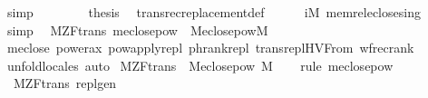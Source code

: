 \begin{isabellebody}
\ simp\isanewline
\ \ \isacommand{{\isacharbraceright}{\kern0pt}}\isamarkupfalse%
\isanewline
\ \ \isamarkupfalse%
\ \isamarkupfalse%
\ {\isacharquery}{\kern0pt}thesis\ \isamarkupfalse%
\ transrec{\isacharunderscore}{\kern0pt}replacement{\isacharunderscore}{\kern0pt}def\isanewline
\ \ \ \ \isamarkupfalse%
\ {\isacartoucheopen}i{\isasymin}M{\isacartoucheclose}\ memrel{\isacharunderscore}{\kern0pt}eclose{\isacharunderscore}{\kern0pt}sing\ \isamarkupfalse%
\ simp\isanewline
{}\isamarkupfalse%
%
\endisatagproof
{\isafoldproof}%
%
\isadelimproof
\isanewline
%
\endisadelimproof
\isanewline
\isanewline
{}\isamarkupfalse%
\ {\isacharparenleft}{\kern0pt}\ M{\isacharunderscore}{\kern0pt}ZF{\isacharunderscore}{\kern0pt}trans{\isacharparenright}{\kern0pt}\ meclose{\isacharunderscore}{\kern0pt}pow\ {\isacharcolon}{\kern0pt}\ {\isachardoublequoteopen}M{\isacharunderscore}{\kern0pt}eclose{\isacharunderscore}{\kern0pt}pow{\isacharparenleft}{\kern0pt}{\isacharhash}{\kern0pt}{\isacharhash}{\kern0pt}M{\isacharparenright}{\kern0pt}{\isachardoublequoteclose}\isanewline
%
\isadelimproof
\ \ %
\endisadelimproof
%
\isatagproof
{}\isamarkupfalse%
\ meclose\ power{\isacharunderscore}{\kern0pt}ax\ powapply{\isacharunderscore}{\kern0pt}repl\ phrank{\isacharunderscore}{\kern0pt}repl\ trans{\isacharunderscore}{\kern0pt}repl{\isacharunderscore}{\kern0pt}HVFrom\ wfrec{\isacharunderscore}{\kern0pt}rank\isanewline
\ \ \isamarkupfalse%
\ unfold{\isacharunderscore}{\kern0pt}locales\ auto%
\endisatagproof
{\isafoldproof}%
%
\isadelimproof
\isanewline
%
\endisadelimproof
\isanewline
{}\isamarkupfalse%
\ M{\isacharunderscore}{\kern0pt}ZF{\isacharunderscore}{\kern0pt}trans\ {\isasymsubseteq}\ M{\isacharunderscore}{\kern0pt}eclose{\isacharunderscore}{\kern0pt}pow\ {\isachardoublequoteopen}{\isacharhash}{\kern0pt}{\isacharhash}{\kern0pt}M{\isachardoublequoteclose}\isanewline
%
\isadelimproof
\ \ %
\endisadelimproof
%
\isatagproof
{}\isamarkupfalse%
\ {\isacharparenleft}{\kern0pt}rule\ meclose{\isacharunderscore}{\kern0pt}pow{\isacharparenright}{\kern0pt}%
\endisatagproof
{\isafoldproof}%
%
\isadelimproof
\isanewline
%
\endisadelimproof
\isanewline
{}\isamarkupfalse%
\ {\isacharparenleft}{\kern0pt}\ M{\isacharunderscore}{\kern0pt}ZF{\isacharunderscore}{\kern0pt}trans{\isacharparenright}{\kern0pt}\ repl{\isacharunderscore}{\kern0pt}gen\ {\isacharcolon}{\kern0pt}\isanewline

\end{isabellebody}
